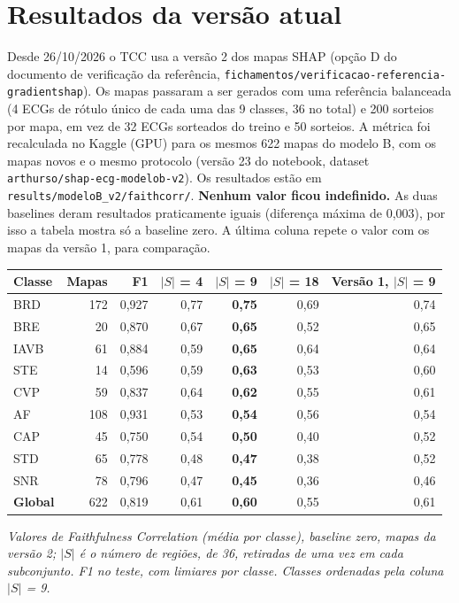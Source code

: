 \documentclass[11pt,a4paper]{article}
\begin{document}
\section{Resultados da versão atual}
Desde 26/10/2026 o TCC usa a versão 2 dos mapas SHAP (opção D do documento de verificação da referência, \texttt{fichamentos/verificacao-referencia-gradientshap}). Os mapas passaram a ser gerados com uma referência balanceada (4 ECGs de rótulo único de cada uma das 9 classes, 36 no total) e 200 sorteios por mapa, em vez de 32 ECGs sorteados do treino e 50 sorteios. A métrica foi recalculada no Kaggle (GPU) para os mesmos 622 mapas do modelo B, com os mapas novos e o mesmo protocolo (versão 23 do notebook, dataset \texttt{arthurso/shap-ecg-modelob-v2}). Os resultados estão em \texttt{results/modeloB\_v2/faithcorr/}. \textbf{Nenhum valor ficou indefinido.} As duas baselines deram resultados praticamente iguais (diferença máxima de 0,003), por isso a tabela mostra só a baseline zero. A última coluna repete o valor com os mapas da versão 1, para comparação.

\begin{center}\small
\begin{tabularx}{\linewidth}{Xrrrrrr}
\toprule
\textbf{Classe} & \textbf{Mapas} & \textbf{F1} & \textbf{$|S|$ = 4} & \textbf{$|S|$ = 9} & \textbf{$|S|$ = 18} & \textbf{Versão 1, $|S|$ = 9} \\
\midrule
BRD  & 172 & 0,927 & 0,77 & \textbf{0,75} & 0,69 & 0,74 \\
BRE  &  20 & 0,870 & 0,67 & \textbf{0,65} & 0,52 & 0,65 \\
IAVB &  61 & 0,884 & 0,59 & \textbf{0,65} & 0,64 & 0,64 \\
STE  &  14 & 0,596 & 0,59 & \textbf{0,63} & 0,53 & 0,60 \\
CVP  &  59 & 0,837 & 0,64 & \textbf{0,62} & 0,55 & 0,61 \\
AF   & 108 & 0,931 & 0,53 & \textbf{0,54} & 0,56 & 0,54 \\
CAP  &  45 & 0,750 & 0,54 & \textbf{0,50} & 0,40 & 0,52 \\
STD  &  65 & 0,778 & 0,48 & \textbf{0,47} & 0,38 & 0,52 \\
SNR  &  78 & 0,796 & 0,47 & \textbf{0,45} & 0,36 & 0,46 \\
\midrule
\textbf{Global} & 622 & 0,819 & 0,61 & \textbf{0,60} & 0,55 & 0,61 \\
\bottomrule
\end{tabularx}
\end{center}
\textit{Valores de Faithfulness Correlation (média por classe), baseline zero, mapas da versão 2; $|S|$ é o número de regiões, de 36, retiradas de uma vez em cada subconjunto. F1 no teste, com limiares por classe. Classes ordenadas pela coluna $|S|$ = 9.}
\end{document}
